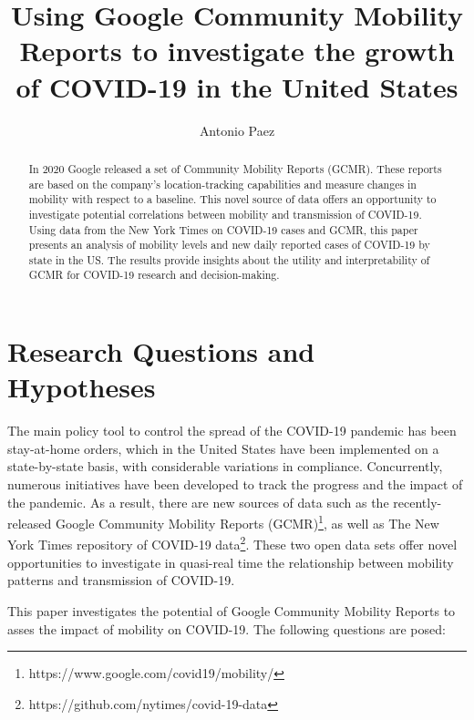 \documentclass[]{elsarticle} %
\begin{document}
\begin{frontmatter}

  \title{Using Google Community Mobility Reports to investigate the growth of
COVID-19 in the United States}
    \author[McMaster University]{Antonio Paez}
      \address[McMaster University]{School of Geography and Earth Sciences, McMaster University, Hamilton,
ON, L8S 4K1, Canada}
  
  \begin{abstract}
  In 2020 Google released a set of Community Mobility Reports (GCMR).
  These reports are based on the company's location-tracking capabilities
  and measure changes in mobility with respect to a baseline. This novel
  source of data offers an opportunity to investigate potential
  correlations between mobility and transmission of COVID-19. Using data
  from the New York Times on COVID-19 cases and GCMR, this paper presents
  an analysis of mobility levels and new daily reported cases of COVID-19
  by state in the US. The results provide insights about the utility and
  interpretability of GCMR for COVID-19 research and decision-making.
  \end{abstract}
  
 \end{frontmatter}

\hypertarget{research-questions-and-hypotheses}{%
\section{Research Questions and
Hypotheses}\label{research-questions-and-hypotheses}}

The main policy tool to control the spread of the COVID-19 pandemic has
been stay-at-home orders, which in the United States have been
implemented on a state-by-state basis, with considerable variations in
compliance. Concurrently, numerous initiatives have been developed to
track the progress and the impact of the pandemic. As a result, there
are new sources of data such as the recently-released Google Community
Mobility Reports
(GCMR)\footnote{https://www.google.com/covid19/mobility/}, as well as
The New York Times repository of COVID-19
data\footnote{https://github.com/nytimes/covid-19-data}. These two open
data sets offer novel opportunities to investigate in quasi-real time
the relationship between mobility patterns and transmission of COVID-19.

This paper investigates the potential of Google Community Mobility
Reports to asses the impact of mobility on COVID-19. The following
questions are posed:
\end{document}
